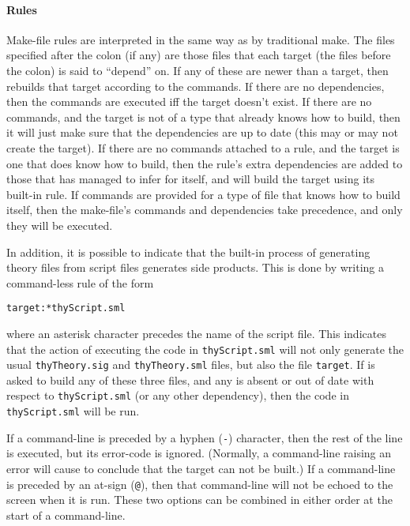\paragraph{Rules}
Make-file rules are interpreted in the same way as by traditional
\textsf{make}.  The files specified after the colon (if any) are those
files that each target (the files before the colon) is said to
``depend'' on.  If any of these are newer than a target, then
\holmake{} rebuilds that target according to the commands.  If there
are no dependencies, then the commands are executed iff the
target doesn't exist.  If there are no commands, and the target is not
of a type that \holmake{} already knows how to build, then it will
just make sure that the dependencies are up to date (this may or
may not create the target).  If there are no commands attached to a
rule, and the target is one that \holmake{} does know how to build,
then the rule's extra dependencies are added to those that \holmake{}
has managed to infer for itself, and \holmake{} will build the target
using its built-in rule.  If commands are provided for a type of file
that \holmake{} knows how to build itself, then the make-file's
commands and dependencies take precedence, and only they will be
executed.

In addition, it is possible to indicate that the built-in process of generating theory files from script files generates side products.
This is done by writing a command-less rule of the form
\begin{alltt}
   target : *thyScript.sml
\end{alltt}
where an asterisk character precedes the name of the script file.
This indicates that the action of executing the code in \texttt{thyScript.sml} will not only generate the usual \texttt{thyTheory.sig} and \texttt{thyTheory.sml} files, but also the file \texttt{target}.
If \holmake{} is asked to build any of these three files, and any is absent or out of date with respect to \texttt{thyScript.sml} (or any other dependency), then the code in \texttt{thyScript.sml} will be run.

If a command-line is preceded by a hyphen (\verb!-!) character, then
the rest of the line is executed, but its error-code is ignored.
(Normally, a command-line raising an error will cause \holmake{} to
conclude that the target can not be built.)  If a command-line is
preceded by an at-sign (\verb!@!), then that command-line will not be
echoed to the screen when it is run.  These two options can be
combined in either order at the start of a command-line.


